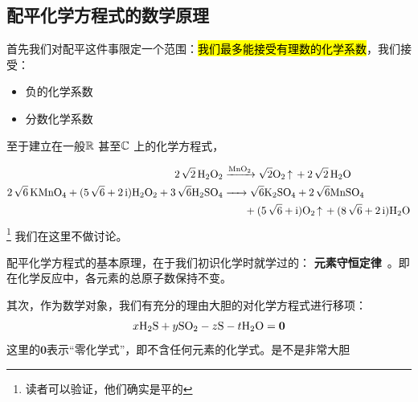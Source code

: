 \documentclass{chem-art}
\begin{document}
\subsection{配平化学方程式的数学原理}

首先我们对配平这件事限定一个范围：\hl{我们最多能接受有理数的化学系数}，我们接受：

\begin{itemize}
    \item \checkmark 负的化学系数
    \item \checkmark 分数化学系数
\end{itemize}
至于建立在一般\(\mathbb{R}\)
甚至\(\mathbb{C}\) 上的化学方程式，

\begin{align*}
    \ce{2\sqrt{2} H2O2 &->[MnO2] \sqrt{2}O2 ^ + 2\sqrt{2} H2O}\\
    \ce{2\sqrt{6} KMnO4 + (5\sqrt{6} + 2\i)H2O2 + 3\sqrt{6}H2SO4 &->
        \sqrt{6}K2SO4 + 2\sqrt{6}MnSO4 \\
    & \qquad {} + (5\sqrt{6} + \i)O2 ^ + (8\sqrt{6} + 2\i)H2O}
\end{align*}\footnote{读者可以验证，他们确实是平的}
我们在这里不做讨论。

配平化学方程式的基本原理，在于我们初识化学时就学过的：
\textbf{元素守恒定律}~\cite{YiWuJiaoYuJiaoKeShuHuaXueJiuNianJi}。即在化学反应中，各元素的总原子数保持不变。

其次，作为数学对象，我们有充分的理由大胆的对化学方程式进行移项：
\[
    x \ce{H2S} + y \ce{SO2} - z \ce{S} - t \ce{H2O} = \mathbf{0}
\]
这里的\(\mathbf{0}\)表示“零化学式”，即不含任何元素的化学式。是不是非常大胆 
\end{document}
